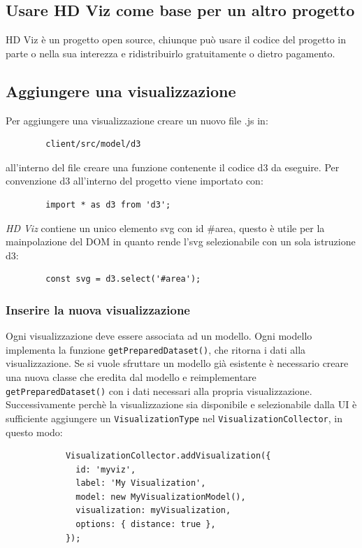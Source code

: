     \subsection{Usare HD Viz come base per un altro progetto}
    HD Viz è un progetto open source\glo{}, chiunque può usare il codice del progetto in parte o nella sua interezza e ridistribuirlo gratuitamente o dietro pagamento.
    \subsection{Aggiungere una visualizzazione}
    Per aggiungere una visualizzazione creare un nuovo file .js in:
    \begin{verbatim}
        client/src/model/d3
    \end{verbatim}
    all'interno del file creare una funzione contenente il codice d3 da eseguire. Per convenzione d3 all'interno del progetto viene importato con:
    \begin{verbatim}
        import * as d3 from 'd3';
    \end{verbatim}
    \textit{HD Viz} contiene un unico elemento svg con id \#area, questo è utile per la mainpolazione del DOM in quanto rende l'svg selezionabile con un sola istruzione d3:
    \begin{verbatim}
        const svg = d3.select('#area');
    \end{verbatim}
        \subsubsection{Inserire la nuova visualizzazione}
        Ogni visualizzazione deve essere associata ad un modello. Ogni modello implementa la funzione  \texttt{getPreparedDataset()}, che ritorna i dati alla visualizzazione. Se si vuole sfruttare un modello già esistente è necessario creare una nuova classe che eredita dal modello e reimplementare \texttt{getPreparedDataset()} con i dati necessari alla propria visualizzazione. Successivamente perchè la visualizzazione sia disponibile e selezionabile dalla UI è sufficiente aggiungere un \texttt{VisualizationType} nel \texttt{VisualizationCollector}, in questo modo:
        \begin{verbatim}
            VisualizationCollector.addVisualization({
              id: 'myviz',
              label: 'My Visualization',
              model: new MyVisualizationModel(),
              visualization: myVisualization,
              options: { distance: true },
            });
        \end{verbatim}
        

